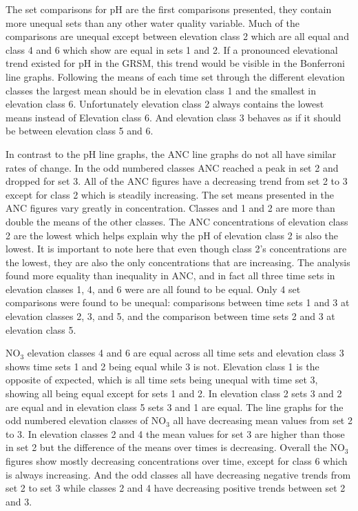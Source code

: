 
The set comparisons for pH are the first comparisons presented, they contain more unequal sets than any other water quality variable.
Much of the comparisons are unequal except between elevation class 2 which are all equal and class 4 and 6 which show are equal in sets 1 and 2.
If a pronounced elevational trend existed for pH in the GRSM, this trend would be visible in the Bonferroni line graphs.
Following the means of each time set through the different elevation classes the largest mean should be in elevation class 1 and the smallest in elevation class 6.
Unfortunately elevation class 2 always contains the lowest means instead of Elevation class 6.
And elevation class 3 behaves as if it should be between elevation class 5 and 6.

In contrast to the pH line graphs, the ANC line graphs do not all have similar rates of change.
In the odd numbered classes ANC reached a peak in set 2 and dropped for set 3.
All of the ANC figures have a decreasing trend from set 2 to 3 except for class 2 which is steadily increasing. 
The set means presented in the ANC figures vary greatly in concentration.
Classes and 1 and 2 are more than double the means of the other classes.
The ANC concentrations of elevation class 2 are the lowest which helps explain why the pH of elevation class 2 is also the lowest.
It is important to note here that even though class 2's concentrations are the lowest, they are also the only concentrations that are increasing.
The analysis found more equality than inequality in ANC, and in fact all three time sets in elevation classes 1, 4, and 6 were are all found to be equal.  
Only 4 set comparisons were found to be unequal: comparisons between time sets 1 and 3 at elevation classes 2, 3, and 5, and the comparison between time sets 2 and 3 at elevation class 5.

NO$_3$ elevation classes 4 and 6 are equal across all time sets and elevation class 3 shows time sets 1 and 2 being equal while 3 is not.  
Elevation class 1 is the opposite of expected, which is all time sets being unequal with time set 3, showing all being equal except for sets 1 and 2.  
In elevation class 2 sets 3 and 2 are equal and in elevation class 5 sets 3 and 1 are equal.
The line graphs for the odd numbered elevation classes of NO$_3$ all have decreasing mean values from set 2 to 3.
In elevation classes 2 and 4 the mean values for set 3 are higher than those in set 2 but the difference of the means over times is decreasing.
Overall the NO$_3$ figures show mostly decreasing concentrations over time, except for class 6 which is always increasing.
And the odd classes all have decreasing negative trends from set 2 to set 3 while classes 2 and 4 have decreasing positive trends between set 2 and 3.

